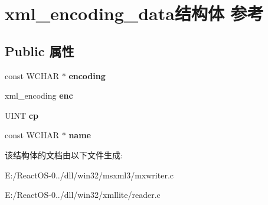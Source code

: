 \hypertarget{structxml__encoding__data}{}\section{xml\+\_\+encoding\+\_\+data结构体 参考}
\label{structxml__encoding__data}
\subsection*{Public 属性}
\begin{DoxyCompactItemize}
\item 
\mbox{\label{structxml__encoding__data_a5dd36ee03ace06be4077c2ad2e036a1a}} 
const W\+C\+H\+AR $\ast$ {\bfseries encoding}
\item 
\mbox{\label{structxml__encoding__data_ae54d5b86fb13511f3576551e300cfec1}} 
xml\+\_\+encoding {\bfseries enc}
\item 
\mbox{\label{structxml__encoding__data_a50b67c6bb259b367a46a8bf397d52ae0}} 
U\+I\+NT {\bfseries cp}
\item 
\mbox{\label{structxml__encoding__data_a92f509f04f1339244878d039d779cc41}} 
const W\+C\+H\+AR $\ast$ {\bfseries name}
\end{DoxyCompactItemize}


该结构体的文档由以下文件生成\+:\begin{DoxyCompactItemize}
\item 
E\+:/\+React\+O\+S-\/0../dll/win32/msxml3/mxwriter.\+c\item 
E\+:/\+React\+O\+S-\/0../dll/win32/xmllite/reader.\+c\end{DoxyCompactItemize}
